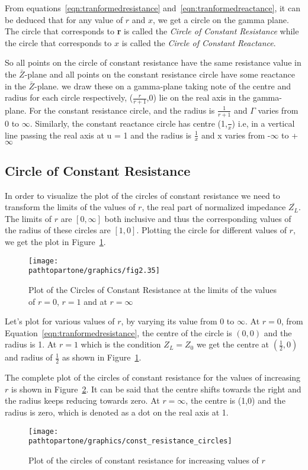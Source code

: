 From equations~\eqref{eqn:tranformedresistance} and~\eqref{eqn:tranformedreactance}, it can be deduced that for any value of $r$ and $x$, we get a circle on the gamma plane. The circle that corresponds to \textbf{r} is called the \emph{Circle of Constant Resistance} while the circle that corresponds to $x$ is called the \emph{Circle of Constant Reactance}.

So all points on the circle of constant resistance have the same resistance value in the $\bar{Z}$-plane and all points on the constant resistance circle have some reactance in the $\bar{Z}$-plane. we draw these on a gamma-plane taking note of the centre and radius for each circle respectively, ($\frac{r}{r + 1}$,0) lie on the real axis in the gamma-plane. For the constant resistance circle, and the radius is $\frac{1}{r + 1}$ and $\Gamma$ varies from 0 to $\infty$. Similarly, the constant reactance circle has centre (1,$\frac{}{x}$) i.e, in a vertical line passing the real axis at u = 1 and the radius is $\frac{1}{x}$ and x varies from -$\infty$ to + $\infty$

\subsection{Circle of Constant Resistance}
In order to visualize the plot of the circles of constant resistance we need to transform the limits of the values of $r$, the real part of normalized impedance $\bar{Z_L}$. The limits of $r$ are $[0, \infty]$ both inclusive and thus the corresponding values of the radius of these circles are $[1, 0]$. Plotting the circle for different values of $r$, we get the plot in Figure~\ref{fig:ouytre}.
\begin{figure}[h]
\centering
\texttt{[image: \\pathtopartone/graphics/fig2.35]}
\caption{Plot of the Circles of Constant Resistance at the limits of the values of $r = 0$, $r = 1$ and at $r = \infty$}
\label{fig:ouytre}
\end{figure}

Let's plot for various values of $r$, by varying its value from 0 to $\infty$. At $r = 0$, from Equation~\eqref{eqn:tranformedresistance}, the centre of the circle is $(0,0)$ and the radius is 1. At $r = 1$ which is the condition $Z_L = Z_0$ we get the centre at $\left(\frac{1}{2}, 0\right)$ and radius of $\frac{1}{2}$ as shown in Figure~\ref{fig:ouytre}.

The complete plot of the circles of constant resistance for the values of increasing $r$ is shown in Figure~\ref{fig:rghmgfcx}. It can be said that the centre shifts towards the right and the radius keeps reducing towards zero. At $r = \infty$, the centre is (1,0) and the radius is zero, which is denoted as a dot on the real axis at 1.
\begin{figure}[h]
\centering
\texttt{[image: \\pathtopartone/graphics/const\_resistance\_circles]}
\caption{Plot of the circles of constant resistance for increasing values of $r$}
\label{fig:rghmgfcx}
\end{figure}

